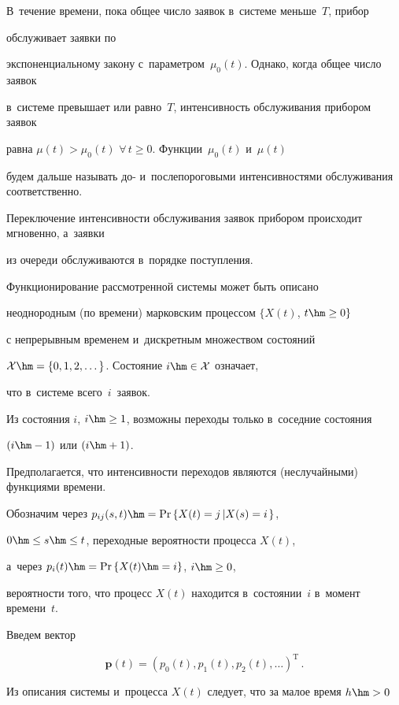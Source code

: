 В~течение времени, пока общее число заявок в~системе меньше~$T$, прибор 

обслуживает заявки по

экспоненциальному закону с~параметром~$\mu_0(t)$. Однако, когда общее число заявок

в~системе превышает или равно~$T$, интенсивность обслуживания прибором заявок

 равна $\mu(t)>\mu_0(t)$ $\forall\, t\ge 0$. Функции~$\mu_0(t)$ и~$\mu(t)$

 будем дальше называть до- и~послепороговыми интенсивностями обслуживания соответственно.

 Переключение интенсивности обслуживания заявок прибором происходит мгновенно, а~заявки

 из очереди обслуживаются в~порядке поступления.



Функционирование рассмотренной системы может быть описано

 неоднородным (по времени) марковским процессом $\{X(t)$, $t\hm\geq 0 \}$

с непрерывным временем и~дискретным множеством состояний

$\mathcal{X}\hm= \{ 0, 1, 2, \dots \}$. Состояние $i\hm\in \mathcal{X}$ означает,

что в~системе всего~$i$~заявок.

Из состояния $i$, $i \hm\ge 1$, возможны переходы только в~соседние состояния

$(i\hm-1)$ или $(i\hm+1)$.

Предполагается, что интенсивности переходов являются (неслучайными) функциями времени.

Обозначим через $p_{ij}(s,t)\hm=\mathrm{Pr} \left\{ X(t)=j\left| X(s)=i\right. \right\}$,

$0\hm\leq s\hm\leq t$, переходные вероятности процесса $X(t)$,

а~через  $p_i(t)\hm=\mathrm{Pr} \left\{ X(t) \hm=i \right\}$, $i \hm\ge 0$,

вероятности того, что процесс $X(t)$ находится в~состоянии~$i$ в~момент времени~$t$.

Введем вектор

$$

{\mathbf{p}}(t) = \left( p_0(t), p_1(t), p_2(t), \dots\right)^{\mathrm{T}}\,.

$$

Из описания системы и~процесса $X(t)$ следует, что за малое время $h\hm>0$ 

